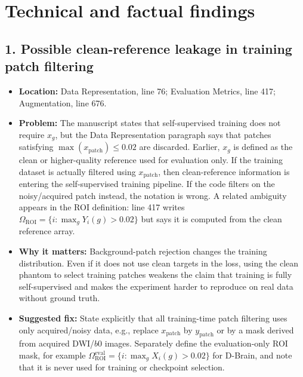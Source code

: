 \documentclass[11pt]{article}
\begin{document}
\section*{Technical and factual findings}

\subsection*{1. Possible clean-reference leakage in training patch filtering}
\begin{itemize}
  \item \textbf{Location:} Data Representation, line 76; Evaluation Metrics, line 417; Augmentation, line 676.
  \item \textbf{Problem:} The manuscript states that self-supervised training does not require $x_g$, but the Data Representation paragraph says that patches satisfying $\max(x_{\mathrm{patch}})\leq0.02$ are discarded. Earlier, $x_g$ is defined as the clean or higher-quality reference used for evaluation only. If the training dataset is actually filtered using $x_{\mathrm{patch}}$, then clean-reference information is entering the self-supervised training pipeline. If the code filters on the noisy/acquired patch instead, the notation is wrong. A related ambiguity appears in the ROI definition: line 417 writes $\Omega_{\mathrm{ROI}}=\{i:\max_g Y_i(g)>0.02\}$ but says it is computed from the clean reference array.
  \item \textbf{Why it matters:} Background-patch rejection changes the training distribution. Even if it does not use clean targets in the loss, using the clean phantom to select training patches weakens the claim that training is fully self-supervised and makes the experiment harder to reproduce on real data without ground truth.
  \item \textbf{Suggested fix:} State explicitly that all training-time patch filtering uses only acquired/noisy data, e.g., replace $x_{\mathrm{patch}}$ by $y_{\mathrm{patch}}$ or by a mask derived from acquired DWI/$b0$ images. Separately define the evaluation-only ROI mask, for example $\Omega_{\mathrm{ROI}}^{\mathrm{eval}}=\{i:\max_g X_i(g)>0.02\}$ for D-Brain, and note that it is never used for training or checkpoint selection.
\end{itemize}
\end{document}
